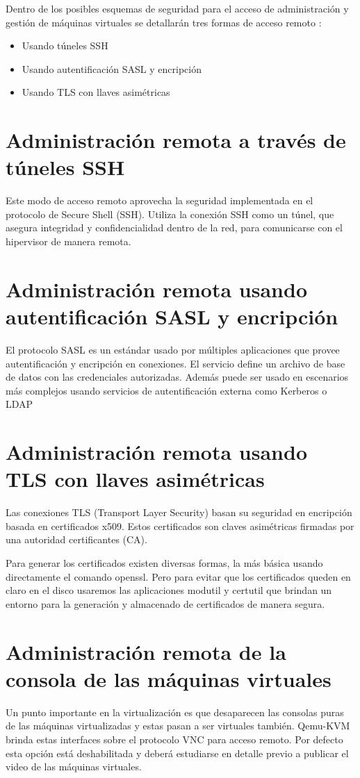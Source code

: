 	Dentro de los posibles esquemas de seguridad para el acceso de
administración y gestión de máquinas virtuales se detallarán tres formas de
	acceso remoto \cite{4}:
	
	\begin{itemize}
		\item Usando túneles SSH
		\item Usando autentificación SASL y encripción
		\item Usando TLS con llaves asimétricas
	\end{itemize}
	
	\section{Administración remota a través de túneles SSH}
	Este modo de acceso remoto aprovecha la seguridad implementada
en el protocolo de Secure Shell (SSH). Utiliza la conexión SSH como un
	túnel, que asegura integridad y confidencialidad dentro de la red, para
comunicarse con el hipervisor de manera remota.
	
	\section{Administración remota usando autentificación SASL y encripción}
	El protocolo SASL es un estándar usado por múltiples aplicaciones
que provee autentificación y encripción en conexiones. El servicio define un
	archivo de base de datos con las credenciales autorizadas. Además puede
ser usado en escenarios más complejos usando servicios de autentificación
externa como Kerberos o LDAP \cite{4}
	
	\section{Administración remota usando TLS con llaves asimétricas}
	Las conexiones TLS (Transport Layer Security) basan su seguridad en
encripción basada en certificados x509. Estos certificados son claves
	asimétricas firmadas por una autoridad certificantes (CA).
\newline
	
	Para generar los certificados existen diversas formas, la más básica
usando directamente el comando openssl. Pero para evitar que los
	certificados queden en claro en el disco usaremos las aplicaciones modutil y
certutil que brindan un entorno para la generación y almacenado de
	certificados de manera segura.
	
	\section{Administración remota de la consola de las máquinas virtuales}
	Un punto importante en la virtualización es que desaparecen las
consolas puras de las máquinas virtualizadas y estas pasan a ser virtuales
	también. Qemu-KVM brinda estas interfaces sobre el protocolo VNC para
acceso remoto. Por defecto esta opción está deshabilitada y deberá
	estudiarse en detalle previo a publicar el video de las máquinas virtuales. 
\newline
	
